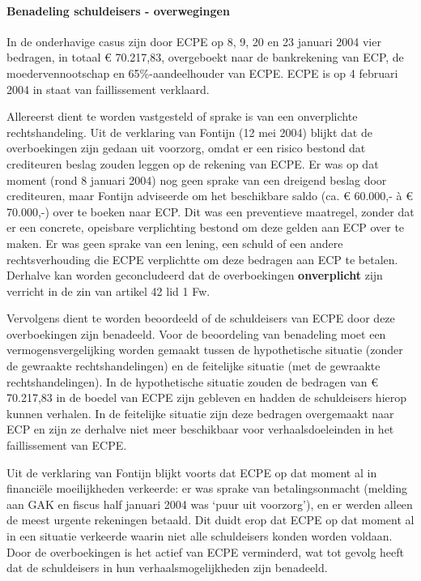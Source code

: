 \documentclass[
  dutch,
  a4paper,
]{article}
\begin{document}
\paragraph{Benadeling schuldeisers - overwegingen}\label{benadeling-schuldeisers---overwegingen-48}

In de onderhavige casus zijn door ECPE op 8, 9, 20 en 23 januari 2004 vier bedragen, in totaal € 70.217,83, overgeboekt naar de bankrekening van ECP, de moedervennootschap en 65\%-aandeelhouder van ECPE. ECPE is op 4 februari 2004 in staat van faillissement verklaard.

Allereerst dient te worden vastgesteld of sprake is van een onverplichte rechtshandeling. Uit de verklaring van Fontijn (12 mei 2004) blijkt dat de overboekingen zijn gedaan uit voorzorg, omdat er een risico bestond dat crediteuren beslag zouden leggen op de rekening van ECPE. Er was op dat moment (rond 8 januari 2004) nog geen sprake van een dreigend beslag door crediteuren, maar Fontijn adviseerde om het beschikbare saldo (ca. € 60.000,- à € 70.000,-) over te boeken naar ECP. Dit was een preventieve maatregel, zonder dat er een concrete, opeisbare verplichting bestond om deze gelden aan ECP over te maken. Er was geen sprake van een lening, een schuld of een andere rechtsverhouding die ECPE verplichtte om deze bedragen aan ECP te betalen. Derhalve kan worden geconcludeerd dat de overboekingen \textbf{onverplicht} zijn verricht in de zin van artikel 42 lid 1 Fw.

Vervolgens dient te worden beoordeeld of de schuldeisers van ECPE door deze overboekingen zijn benadeeld. Voor de beoordeling van benadeling moet een vermogensvergelijking worden gemaakt tussen de hypothetische situatie (zonder de gewraakte rechtshandelingen) en de feitelijke situatie (met de gewraakte rechtshandelingen). In de hypothetische situatie zouden de bedragen van € 70.217,83 in de boedel van ECPE zijn gebleven en hadden de schuldeisers hierop kunnen verhalen. In de feitelijke situatie zijn deze bedragen overgemaakt naar ECP en zijn ze derhalve niet meer beschikbaar voor verhaalsdoeleinden in het faillissement van ECPE.

Uit de verklaring van Fontijn blijkt voorts dat ECPE op dat moment al in financiële moeilijkheden verkeerde: er was sprake van betalingsonmacht (melding aan GAK en fiscus half januari 2004 was `puur uit voorzorg'), en er werden alleen de meest urgente rekeningen betaald. Dit duidt erop dat ECPE op dat moment al in een situatie verkeerde waarin niet alle schuldeisers konden worden voldaan. Door de overboekingen is het actief van ECPE verminderd, wat tot gevolg heeft dat de schuldeisers in hun verhaalsmogelijkheden zijn benadeeld.
\end{document}
